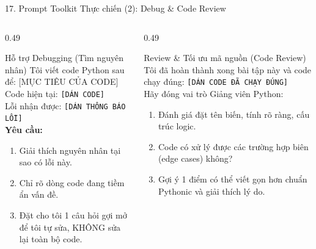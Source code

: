 \documentclass[aspectratio=169, 10pt]{beamer}
\begin{document}
\begin{frame}{17. Prompt Toolkit Thực chiến (2): Debug \& Code Review}
  \begin{columns}[T]
    \begin{column}{0.49\textwidth}
      \begin{cbox}[accentorange]{Hỗ trợ Debugging (Tìm nguyên nhân)}
        \scriptsize
        Tôi viết code Python sau để: [MỤC TIÊU CỦA CODE]\\[2pt]
        Code hiện tại: \texttt{[DÁN CODE]}\\[2pt]
        Lỗi nhận được: \texttt{[DÁN THÔNG BÁO LỖI]}\\[2pt]
        \textbf{Yêu cầu:}
        \begin{enumerate}\setlength{\itemsep}{1pt}
          \item Giải thích nguyên nhân tại sao có lỗi này.
          \item Chỉ rõ dòng code đang tiềm ẩn vấn đề.
          \item Đặt cho tôi 1 câu hỏi gợi mở để tôi tự sửa, KHÔNG sửa lại toàn bộ code.
        \end{enumerate}
      \end{cbox}
    \end{column}
    \begin{column}{0.49\textwidth}
      \begin{cbox}[primaryblue]{Review \& Tối ưu mã nguồn (Code Review)}
        \scriptsize
        Tôi đã hoàn thành xong bài tập này và code chạy đúng: \texttt{[DÁN CODE ĐÃ CHẠY ĐÚNG]}\\[2pt]
        Hãy đóng vai trò Giảng viên Python:
        \begin{enumerate}\setlength{\itemsep}{1pt}
          \item Đánh giá đặt tên biến, tính rõ ràng, cấu trúc logic.
          \item Code có xử lý được các trường hợp biên (edge cases) không?
          \item Gợi ý 1 điểm có thể viết gọn hơn chuẩn Pythonic và giải thích lý do.
        \end{enumerate}
      \end{cbox}
    \end{column}
  \end{columns}
\end{frame}
\end{document}
